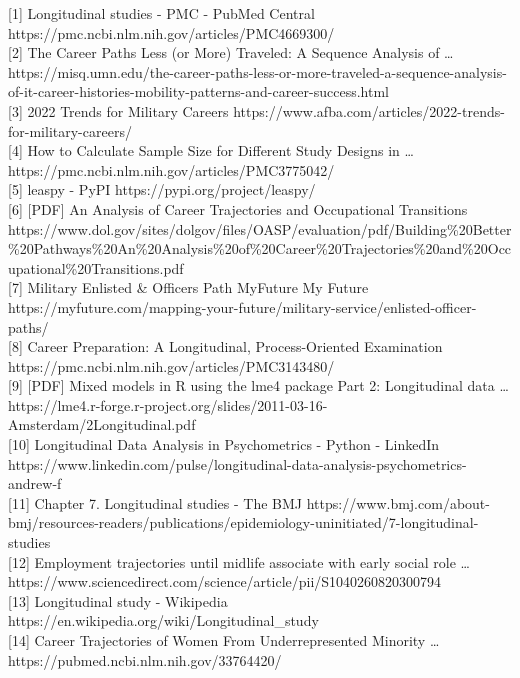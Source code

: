 \documentclass[
  letterpaper,
  DIV=11,
  numbers=noendperiod]{scrartcl}
\begin{document}
{[}1{]} Longitudinal studies - PMC - PubMed Central
https://pmc.ncbi.nlm.nih.gov/articles/PMC4669300/\\
{[}2{]} The Career Paths Less (or More) Traveled: A Sequence Analysis of
\ldots{}
https://misq.umn.edu/the-career-paths-less-or-more-traveled-a-sequence-analysis-of-it-career-histories-mobility-patterns-and-career-success.html\\
{[}3{]} 2022 Trends for Military Careers
https://www.afba.com/articles/2022-trends-for-military-careers/\\
{[}4{]} How to Calculate Sample Size for Different Study Designs in
\ldots{} https://pmc.ncbi.nlm.nih.gov/articles/PMC3775042/\\
{[}5{]} leaspy - PyPI https://pypi.org/project/leaspy/\\
{[}6{]} {[}PDF{]} An Analysis of Career Trajectories and Occupational
Transitions
https://www.dol.gov/sites/dolgov/files/OASP/evaluation/pdf/Building\%20Better\%20Pathways\%20An\%20Analysis\%20of\%20Career\%20Trajectories\%20and\%20Occupational\%20Transitions.pdf\\
{[}7{]} Military Enlisted \& Officers Path \textbar{} MyFuture
\textbar{} My Future
https://myfuture.com/mapping-your-future/military-service/enlisted-officer-paths/\\
{[}8{]} Career Preparation: A Longitudinal, Process-Oriented Examination
https://pmc.ncbi.nlm.nih.gov/articles/PMC3143480/\\
{[}9{]} {[}PDF{]} Mixed models in R using the lme4 package Part 2:
Longitudinal data \ldots{}
https://lme4.r-forge.r-project.org/slides/2011-03-16-Amsterdam/2Longitudinal.pdf\\
{[}10{]} Longitudinal Data Analysis in Psychometrics - Python - LinkedIn
https://www.linkedin.com/pulse/longitudinal-data-analysis-psychometrics-andrew-f\\
{[}11{]} Chapter 7. Longitudinal studies - The BMJ
https://www.bmj.com/about-bmj/resources-readers/publications/epidemiology-uninitiated/7-longitudinal-studies\\
{[}12{]} Employment trajectories until midlife associate with early
social role \ldots{}
https://www.sciencedirect.com/science/article/pii/S1040260820300794\\
{[}13{]} Longitudinal study - Wikipedia
https://en.wikipedia.org/wiki/Longitudinal\_study\\
{[}14{]} Career Trajectories of Women From Underrepresented Minority
\ldots{} https://pubmed.ncbi.nlm.nih.gov/33764420/\\
\end{document}
